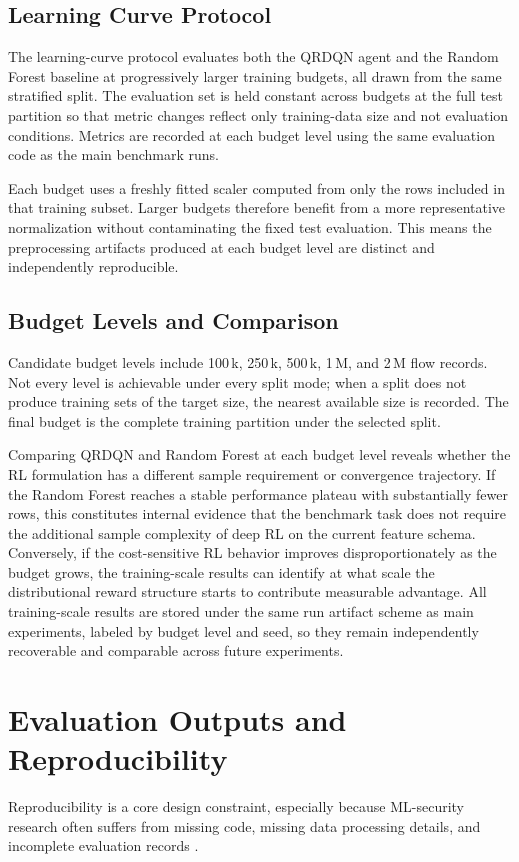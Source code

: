 \subsection{Learning Curve Protocol}
The learning-curve protocol evaluates both the QRDQN agent and the Random Forest baseline at progressively larger training budgets, all drawn from the same stratified split. The evaluation set is held constant across budgets at the full test partition so that metric changes reflect only training-data size and not evaluation conditions. Metrics are recorded at each budget level using the same evaluation code as the main benchmark runs.

Each budget uses a freshly fitted scaler computed from only the rows included in that training subset. Larger budgets therefore benefit from a more representative normalization without contaminating the fixed test evaluation. This means the preprocessing artifacts produced at each budget level are distinct and independently reproducible.

\subsection{Budget Levels and Comparison}
Candidate budget levels include 100\,k, 250\,k, 500\,k, 1\,M, and 2\,M flow records. Not every level is achievable under every split mode; when a split does not produce training sets of the target size, the nearest available size is recorded. The final budget is the complete training partition under the selected split.

Comparing QRDQN and Random Forest at each budget level reveals whether the RL formulation has a different sample requirement or convergence trajectory. If the Random Forest reaches a stable performance plateau with substantially fewer rows, this constitutes internal evidence that the benchmark task does not require the additional sample complexity of deep RL on the current feature schema. Conversely, if the cost-sensitive RL behavior improves disproportionately as the budget grows, the training-scale results can identify at what scale the distributional reward structure starts to contribute measurable advantage. All training-scale results are stored under the same run artifact scheme as main experiments, labeled by budget level and seed, so they remain independently recoverable and comparable across future experiments.

\section{Evaluation Outputs and Reproducibility}
Reproducibility is a core design constraint, especially because ML-security research often suffers from missing code, missing data processing details, and incomplete evaluation records \parencite{Olszewski2023ReproSecurityML}.

